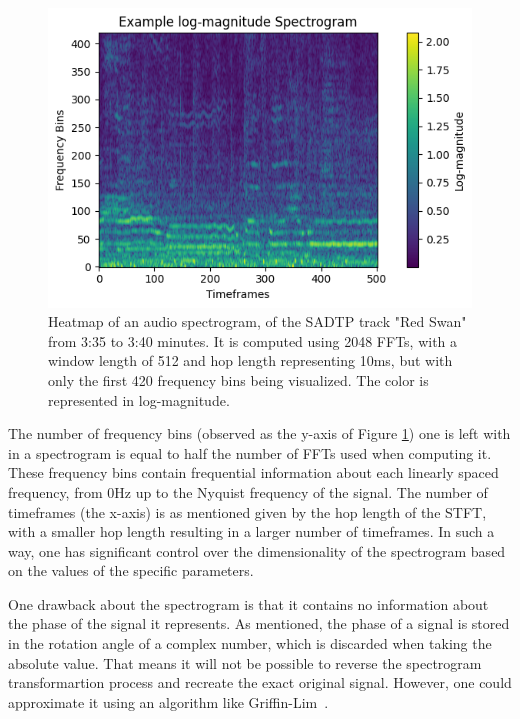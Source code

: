 \begin{figure}[H]
    \centering
    \includegraphics[scale=1.1]{figures/logspectrogram}
    \caption{Heatmap of an audio spectrogram, of the SADTP track "Red Swan" from 3:35 to 3:40 minutes. It is computed using 2048 \glspl{FFT}, with a window length of 512 and hop length representing 10ms, but with only the first 420 frequency bins being visualized. The color is represented in log-magnitude.}
    \label{SpectrogramFigure}
\end{figure}

The number of frequency bins (observed as the y-axis of Figure \ref{SpectrogramFigure}) one is left with in a spectrogram is equal to half the number of \glspl{FFT} used when computing it. These frequency bins contain frequential information about each linearly spaced frequency, from 0Hz up to the Nyquist frequency of the signal. The number of timeframes (the x-axis) is as mentioned given by the hop length of the \gls{STFT}, with a smaller hop length resulting in a larger number of timeframes. In such a way, one has significant control over the dimensionality of the spectrogram based on the values of the specific parameters. 

One drawback about the spectrogram is that it contains no information about the phase of the signal it represents. As mentioned, the phase of a signal is stored in the rotation angle of a complex number, which is discarded when taking the absolute value. That means it will not be possible to reverse the spectrogram transformartion process and recreate the exact original signal. However, one could approximate it using an algorithm like Griffin-Lim~\cite{1164317}.

